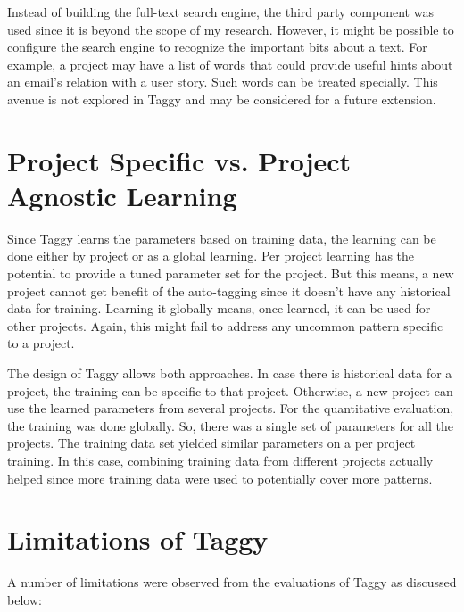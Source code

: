 Instead of building the full-text search engine, the third party component was used since it is beyond the scope of my research. However, it might be possible to configure the search engine to recognize the important bits about a text. For example, a project may have a list of words that could provide useful hints about an email's relation with a user story. Such words can be treated specially. This avenue is not explored in Taggy and may be considered for a future extension.

\section {Project Specific vs. Project Agnostic Learning}
Since Taggy learns the parameters based on training data, the learning can be done either by project or as a global learning. Per project learning has the potential to provide a tuned parameter set for the project. But this means, a new project cannot get benefit of the auto-tagging since it doesn't have any historical data for training. Learning it globally means, once learned, it can be used for other projects. Again, this might fail to address any uncommon pattern specific to a project.

The design of Taggy allows both approaches. In case there is historical data for a project, the training can be specific to that project. Otherwise, a new project can use the learned parameters from several projects. For the quantitative evaluation, the training was done globally. So, there was a single set of parameters for all the projects. The training data set yielded similar parameters on a per project training. In this case, combining training data from different projects actually helped since more training data were used to potentially cover more patterns.

\section{Limitations of Taggy}
A number of limitations were observed from the evaluations of Taggy as discussed below:

